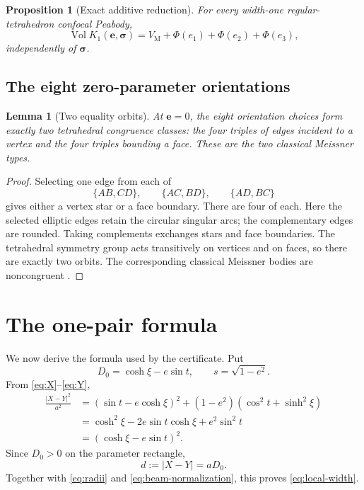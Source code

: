 \documentclass[11pt]{article}
\numberwithin{equation}{section}
\newtheorem{proposition}[theorem]{Proposition}
\newtheorem{lemma}[theorem]{Lemma}
\theoremstyle{remark}
\newcommand{\Vol}{\operatorname{Vol}}
\newcommand{\VM}{V_{\mathrm M}}
\begin{document}
\begin{proposition}[Exact additive reduction]
\label{prop:additive}
For every width-one regular-tetrahedron confocal Peabody,
\begin{equation}
  \Vol K_1(\mathbf e,\boldsymbol\sigma)
  =\VM+\Phi(e_1)+\Phi(e_2)+\Phi(e_3),
  \label{eq:additive-volume}
\end{equation}
independently of \(\boldsymbol\sigma\).
\end{proposition}

\subsection{The eight zero-parameter orientations}

\begin{lemma}[Two equality orbits]
\label{lem:orientation-orbits}
At \(\mathbf e=0\), the eight orientation choices form exactly two tetrahedral congruence classes: the four triples of edges incident to a vertex and the four triples bounding a face.  These are the two classical Meissner types.
\end{lemma}

\begin{proof}
Selecting one edge from each of
\[
  \{AB,CD\},\qquad \{AC,BD\},\qquad \{AD,BC\}
\]
gives either a vertex star or a face boundary.  There are four of each.
Here the selected elliptic edges retain the circular singular arcs; the
complementary edges are rounded.  Taking complements exchanges stars and
face boundaries.  The tetrahedral symmetry group acts transitively on
vertices and on faces, so there are exactly two orbits.  The corresponding
classical Meissner bodies are noncongruent \cite{KawohlWeber2011}.
\end{proof}

\section{The one-pair formula}
\label{sec:pair}

We now derive the formula used by the certificate.  Put
\[
  D_0=\cosh\xi-e\sin t,
  \qquad s=\sqrt{1-e^2}.
\]
From \eqref{eq:X}--\eqref{eq:Y},
\begin{align*}
  \frac{|X-Y|^2}{a^2}
  &=(\sin t-e\cosh\xi)^2
    +(1-e^2)(\cos^2t+\sinh^2\xi)\\
  &=\cosh^2\xi-2e\sin t\cosh\xi+e^2\sin^2t\\
  &=(\cosh\xi-e\sin t)^2.
\end{align*}
Since \(D_0>0\) on the parameter rectangle,
\begin{equation}
  d:=|X-Y|=aD_0.
  \label{eq:d}
\end{equation}
Together with \eqref{eq:radii} and \eqref{eq:beam-normalization}, this proves \eqref{eq:local-width}.
\end{document}
